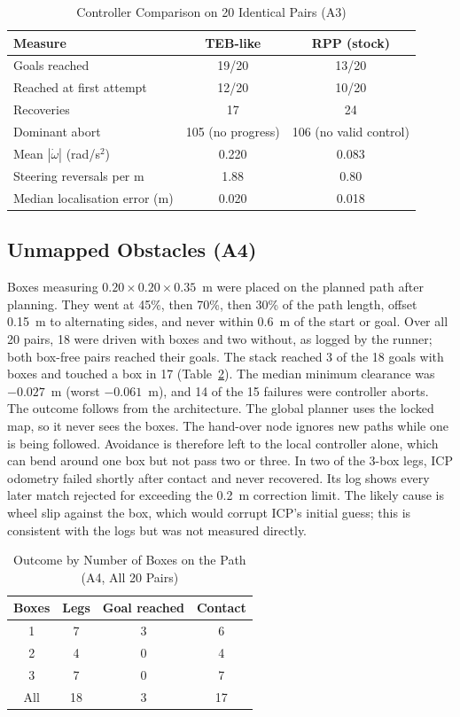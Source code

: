 \documentclass[conference]{IEEEtran}
\begin{document}
\begin{table}[t]
\caption{Controller Comparison on 20 Identical Pairs (A3)}
\label{tab:a3}
\centering
\footnotesize
\begin{tabular}{@{}lcc@{}}
\toprule
Measure & TEB-like & RPP (stock) \\
\midrule
Goals reached & 19/20 & 13/20 \\
Reached at first attempt & 12/20 & 10/20 \\
Recoveries & 17 & 24 \\
Dominant abort & 105 (no progress) & 106 (no valid control) \\
Mean $|\dot\omega|$ (rad/s$^2$) & 0.220 & 0.083 \\
Steering reversals per m & 1.88 & 0.80 \\
Median localisation error (m) & 0.020 & 0.018 \\
\bottomrule
\end{tabular}
\end{table}

\subsection{Unmapped Obstacles (A4)}
\label{sec:a4}
Boxes measuring $0.20\times0.20\times0.35$~m were placed on the planned path after planning. They went at 45\%, then 70\%, then 30\% of the path length, offset 0.15~m to alternating sides, and never within 0.6~m of the start or goal. Over all 20 pairs, 18 were driven with boxes and two without, as logged by the runner; both box-free pairs reached their goals. The stack reached 3 of the 18 goals with boxes and touched a box in 17 (Table~\ref{tab:a4}). The median minimum clearance was $-0.027$~m (worst $-0.061$~m), and 14 of the 15 failures were controller aborts. The outcome follows from the architecture. The global planner uses the locked map, so it never sees the boxes. The hand-over node ignores new paths while one is being followed. Avoidance is therefore left to the local controller alone, which can bend around one box but not pass two or three. In two of the 3-box legs, ICP odometry failed shortly after contact and never recovered. Its log shows every later match rejected for exceeding the 0.2~m correction limit. The likely cause is wheel slip against the box, which would corrupt ICP's initial guess; this is consistent with the logs but was not measured directly.

\begin{table}[t]
\caption{Outcome by Number of Boxes on the Path (A4, All 20 Pairs)}
\label{tab:a4}
\centering
\footnotesize
\begin{tabular}{@{}cccc@{}}
\toprule
Boxes & Legs & Goal reached & Contact \\
\midrule
1 & 7 & 3 & 6 \\
2 & 4 & 0 & 4 \\
3 & 7 & 0 & 7 \\
\midrule
All & 18 & 3 & 17 \\
\bottomrule
\end{tabular}
\end{table}
\end{document}
